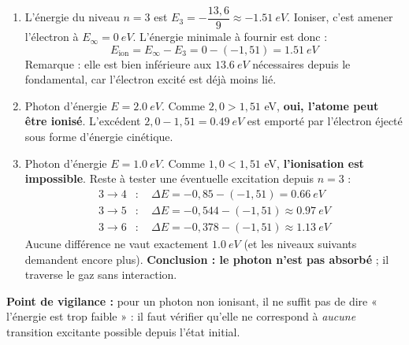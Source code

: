 \documentclass[11pt]{article}
\begin{document}
\begin{corrige}
\begin{enumerate}
\item L'énergie du niveau $n = 3$ est $E_3 = -\dfrac{13,6}{9} \approx \SI{-1,51}{eV}$. Ioniser, c'est amener l'électron à $E_\infty = \SI{0}{eV}$. L'énergie minimale à fournir est donc :
\[
E_{\text{ion}} = E_\infty - E_3 = 0 - (-1,51) = \SI{1,51}{eV}
\]
Remarque : elle est bien inférieure aux $\SI{13,6}{eV}$ nécessaires depuis le fondamental, car l'électron excité est déjà moins lié.
\item Photon d'énergie $E = \SI{2,0}{eV}$. Comme $2,0 > 1,51$ eV, \textbf{oui, l'atome peut être ionisé}. L'excédent $2,0 - 1,51 = \SI{0,49}{eV}$ est emporté par l'électron éjecté sous forme d'énergie cinétique.
\item Photon d'énergie $E = \SI{1,0}{eV}$. Comme $1,0 < 1,51$ eV, \textbf{l'ionisation est impossible}. Reste à tester une éventuelle excitation depuis $n = 3$ :
\begin{align*}
3\to 4 &: \quad \Delta E = -0,85 - (-1,51) = \SI{0,66}{eV} \\
3\to 5 &: \quad \Delta E = -0,544 - (-1,51) \approx \SI{0,97}{eV} \\
3\to 6 &: \quad \Delta E = -0,378 - (-1,51) \approx \SI{1,13}{eV}
\end{align*}
Aucune différence ne vaut exactement $\SI{1,0}{eV}$ (et les niveaux suivants demandent encore plus). \textbf{Conclusion : le photon n'est pas absorbé} ; il traverse le gaz sans interaction.
\end{enumerate}
\textbf{Point de vigilance :} pour un photon non ionisant, il ne suffit pas de dire « l'énergie est trop faible » : il faut vérifier qu'elle ne correspond à \emph{aucune} transition excitante possible depuis l'état initial.
\end{corrige}
\end{document}
